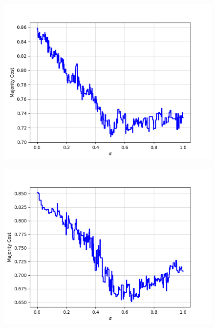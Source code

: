 \begin{figure}[h]
\begin{minipage}{.19\textwidth}
  {\includegraphics[width=\linewidth]{plots/omniglot-intra-ac/Braille}}
\end{minipage}
\begin{minipage}{.19\textwidth}
  \centering
  {\includegraphics[width=\linewidth]{plots/omniglot-intra-ac/Burmese_(Myanmar)}}
\end{minipage}
\begin{minipage}{.19\textwidth}
  \centering

\end{minipage}
\end{figure}
